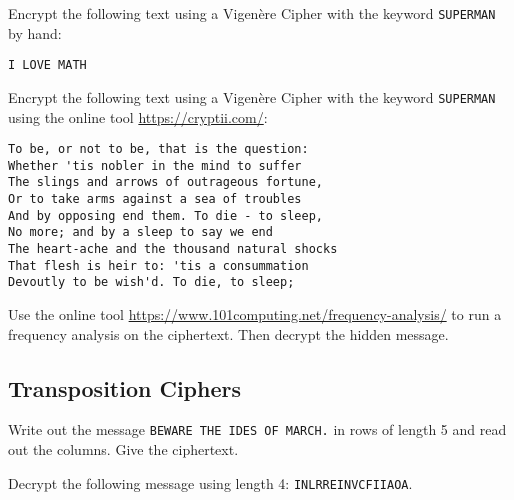 \documentclass[11pt,a4paper]{report}
\begin{document}






\begin{ex}
Encrypt the following text using a Vigenère Cipher with the keyword \verb|SUPERMAN| by hand:
\begin{verbatim}
I LOVE MATH
\end{verbatim}

\end{ex}


\begin{ex}
Encrypt the following text using a Vigenère Cipher with the keyword \verb|SUPERMAN| using the online tool \url{https://cryptii.com/}:
\begin{verbatim}
To be, or not to be, that is the question:
Whether 'tis nobler in the mind to suffer
The slings and arrows of outrageous fortune,
Or to take arms against a sea of troubles
And by opposing end them. To die - to sleep,
No more; and by a sleep to say we end
The heart-ache and the thousand natural shocks
That flesh is heir to: 'tis a consummation
Devoutly to be wish'd. To die, to sleep;
\end{verbatim}
\end{ex}



\begin{ex}
Use the online tool \url{https://www.101computing.net/frequency-analysis/} to run a frequency analysis on the ciphertext. Then decrypt the hidden message.
\end{ex}


\subsection{Transposition Ciphers}


\begin{ex}
Write out the message
\verb|BEWARE THE IDES OF MARCH.|
in rows of length 5 and read out the columns. Give the ciphertext.
\end{ex}

\begin{ex}
Decrypt the following message using length 4: \verb|INLRREINVCFIIAOA|.
\end{ex}
\end{document}
